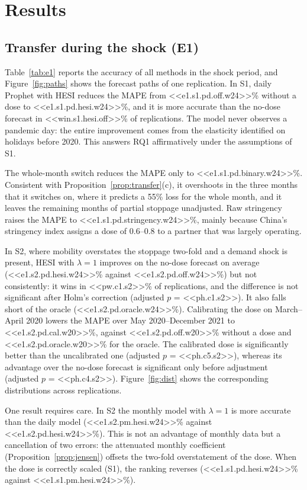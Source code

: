 \documentclass{article}
\theoremstyle{plain}
\theoremstyle{definition}
\theoremstyle{remark}
\begin{document}
\section{Results}\label{sec:results}
\subsection{Transfer during the shock (E1)}
Table~\ref{tab:e1} reports the accuracy of all methods in the shock period, and Figure~\ref{fig:paths} shows the forecast paths of one replication. In S1, daily Prophet with HESI reduces the MAPE from <<e1.s1.pd.off.w24>>\% without a dose to <<e1.s1.pd.hesi.w24>>\%, and it is more accurate than the no-dose forecast in <<win.s1.hesi.off>>\% of replications. The model never observes a pandemic day: the entire improvement comes from the elasticity identified on holidays before 2020. This answers RQ1 affirmatively under the assumptions of S1.

The whole-month switch reduces the MAPE only to <<e1.s1.pd.binary.w24>>\%. Consistent with Proposition~\ref{prop:transfer}(c), it overshoots in the three months that it switches on, where it predicts a 55\% loss for the whole month, and it leaves the remaining months of partial stoppage unadjusted. Raw stringency raises the MAPE to <<e1.s1.pd.stringency.w24>>\%, mainly because China's stringency index assigns a dose of 0.6--0.8 to a partner that was largely operating.

In S2, where mobility overstates the stoppage two-fold and a demand shock is present, HESI with $\lambda=1$ improves on the no-dose forecast on average (<<e1.s2.pd.hesi.w24>>\% against <<e1.s2.pd.off.w24>>\%) but not consistently: it wins in <<pw.c1.s2>>\% of replications, and the difference is not significant after Holm's correction (adjusted $p$ = <<ph.c1.s2>>). It also falls short of the oracle (<<e1.s2.pd.oracle.w24>>\%). Calibrating the dose on March--April 2020 lowers the MAPE over May 2020--December 2021 to <<e1.s2.pd.cal.w20>>\%, against <<e1.s2.pd.off.w20>>\% without a dose and <<e1.s2.pd.oracle.w20>>\% for the oracle. The calibrated dose is significantly better than the uncalibrated one (adjusted $p$ = <<ph.c5.s2>>), whereas its advantage over the no-dose forecast is significant only before adjustment (adjusted $p$ = <<ph.c4.s2>>). Figure~\ref{fig:dist} shows the corresponding distributions across replications.

One result requires care. In S2 the monthly model with $\lambda=1$ is more accurate than the daily model (<<e1.s2.pm.hesi.w24>>\% against <<e1.s2.pd.hesi.w24>>\%). This is not an advantage of monthly data but a cancellation of two errors: the attenuated monthly coefficient (Proposition~\ref{prop:jensen}) offsets the two-fold overstatement of the dose. When the dose is correctly scaled (S1), the ranking reverses (<<e1.s1.pd.hesi.w24>>\% against <<e1.s1.pm.hesi.w24>>\%).
\end{document}

